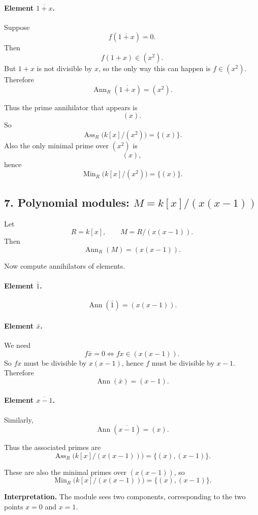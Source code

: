 \documentclass[12pt,a4paper,oneside]{report}
\DeclareMathOperator{\Ass}{Ass}
\DeclareMathOperator{\Ann}{Ann}
\DeclareMathOperator{\Min}{Min}
\theoremstyle{notespace}
\begin{document}
	\paragraph{Element \(\overline{1+x}\).}
	Suppose
	\[
	f(\overline{1+x})=0.
	\]
	Then
	\[
	f(1+x)\in (x^2).
	\]
	But \(1+x\) is not divisible by \(x\), so the only way this can happen is \(f\in (x^2)\). Therefore
	\[
	\Ann_R(\overline{1+x})=(x^2).
	\]
	
	Thus the prime annihilator that appears is
	\[
	(x).
	\]
	So
	\[
	\Ass_R\bigl(k[x]/(x^2)\bigr)=\{(x)\}.
	\]
	Also the only minimal prime over \((x^2)\) is
	\[
	(x),
	\]
	hence
	\[
	\Min_R\bigl(k[x]/(x^2)\bigr)=\{(x)\}.
	\]
	
	\subsection{7. Polynomial modules: \(M=k[x]/(x(x-1))\)}
	
	Let
	\[
	R=k[x],\qquad M=R/(x(x-1)).
	\]
	Then
	\[
	\Ann_R(M)=(x(x-1)).
	\]
	
	Now compute annihilators of elements.
	
	\paragraph{Element \(\bar 1\).}
	\[
	\Ann(\bar 1)=(x(x-1)).
	\]
	
	\paragraph{Element \(\bar x\).}
	We need
	\[
	f\bar x=0 \iff fx\in (x(x-1)).
	\]
	So \(fx\) must be divisible by \(x(x-1)\), hence \(f\) must be divisible by \(x-1\). Therefore
	\[
	\Ann(\bar x)=(x-1).
	\]
	
	\paragraph{Element \(\overline{x-1}\).}
	Similarly,
	\[
	\Ann(\overline{x-1})=(x).
	\]
	
	Thus the associated primes are
	\[
	\Ass_R\bigl(k[x]/(x(x-1))\bigr)=\{(x),(x-1)\}.
	\]
	
	These are also the minimal primes over \((x(x-1))\), so
	\[
	\Min_R\bigl(k[x]/(x(x-1))\bigr)=\{(x),(x-1)\}.
	\]
	
	\medskip
	
	\noindent
	\textbf{Interpretation.}
	The module sees two components, corresponding to the two points \(x=0\) and \(x=1\).
	
\end{document}

